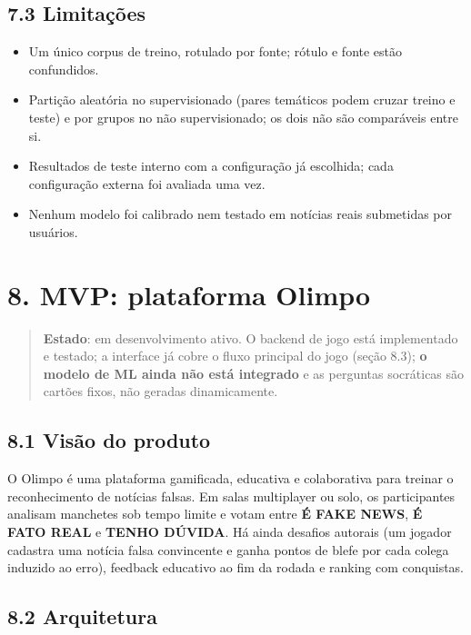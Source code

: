 \documentclass[
  brazilian,
  11pt,
]{article}
\providecommand{\tightlist}{%
  \setlength{\itemsep}{0pt}\setlength{\parskip}{0pt}}
\begin{document}
\subsection{7.3 Limitações}\label{limitauxe7uxf5es}

\begin{itemize}
\tightlist
\item
  Um único corpus de treino, rotulado por fonte; rótulo e fonte estão confundidos.
\item
  Partição aleatória no supervisionado (pares temáticos podem cruzar treino e teste) e por grupos no não supervisionado; os dois não são comparáveis entre si.
\item
  Resultados de teste interno com a configuração já escolhida; cada configuração externa foi avaliada uma vez.
\item
  Nenhum modelo foi calibrado nem testado em notícias reais submetidas por usuários.
\end{itemize}

\section{8. MVP: plataforma Olimpo}\label{mvp-plataforma-olimpo}

\begin{quote}
\textbf{Estado}: em desenvolvimento ativo. O backend de jogo está implementado e testado; a interface já cobre o fluxo principal do jogo (seção 8.3); \textbf{o modelo de ML ainda não está integrado} e as perguntas socráticas são cartões fixos, não geradas dinamicamente.
\end{quote}

\subsection{8.1 Visão do produto}\label{visuxe3o-do-produto}

O Olimpo é uma plataforma gamificada, educativa e colaborativa para treinar o reconhecimento de notícias falsas. Em salas multiplayer ou solo, os participantes analisam manchetes sob tempo limite e votam entre \textbf{É FAKE NEWS}, \textbf{É FATO REAL} e \textbf{TENHO DÚVIDA}. Há ainda desafios autorais (um jogador cadastra uma notícia falsa convincente e ganha pontos de blefe por cada colega induzido ao erro), feedback educativo ao fim da rodada e ranking com conquistas.

\subsection{8.2 Arquitetura}\label{arquitetura}
\end{document}
